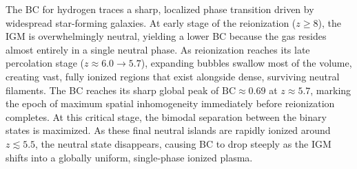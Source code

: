 \documentclass[apj,twocolumn, appendixfloats, twocolappendix, numberedappendix, tighten]{openjournal}
\begin{document}
The BC for hydrogen traces a sharp, localized phase transition driven by widespread star-forming galaxies. At early stage of the reionization ($z \ge 8$), the IGM is overwhelmingly neutral, yielding a lower BC because the gas resides almost entirely in a single neutral phase. As reionization reaches its late percolation stage ($z \approx 6.0 \to 5.7$), expanding  bubbles swallow most of the volume, creating vast, fully ionized regions that exist alongside dense, surviving neutral filaments. The BC reaches its sharp global peak of $\mathrm{BC} \approx 0.69$ at $z \approx 5.7$, marking the epoch of maximum spatial inhomogeneity immediately before reionization completes. At this critical stage, the bimodal separation between the binary states is maximized. As these final neutral islands are rapidly ionized around $z \lesssim 5.5$, the neutral state disappears, causing BC to drop steeply as the IGM shifts into a globally uniform, single-phase ionized plasma.



\end{document}
